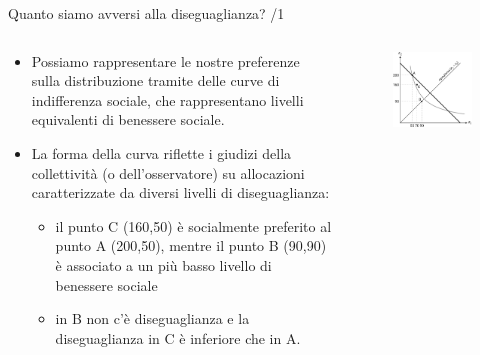 \documentclass[11pt]{beamer}
\begin{document}
\begin{frame}{Quanto siamo avversi alla diseguaglianza? /1}
\begin{columns}
\begin{column}{.5\columnwidth}
\begin{itemize}
\item Possiamo rappresentare le nostre preferenze sulla distribuzione tramite
delle \alert{curve di indifferenza sociale}, che rappresentano livelli equivalenti
di benessere sociale.
\item La forma della curva riflette i giudizi della collettività (o
dell'osservatore) su allocazioni caratterizzate da diversi livelli di
diseguaglianza:
\begin{itemize}
\item il punto C (160,50) è socialmente preferito al punto A (200,50), mentre il
punto B (90,90) è associato a un più basso livello di benessere sociale
\item in B non c'è diseguaglianza e la diseguaglianza in C è inferiore che in A.
\end{itemize}
\end{itemize}
\end{column}

\begin{column}{.5\columnwidth}
\begin{figure}[htbp]
\centering
\includegraphics[width=\textwidth]{./figure/fbs-0.pdf}
\end{figure}
\end{column}
\end{columns}
\end{frame}
\end{document}
